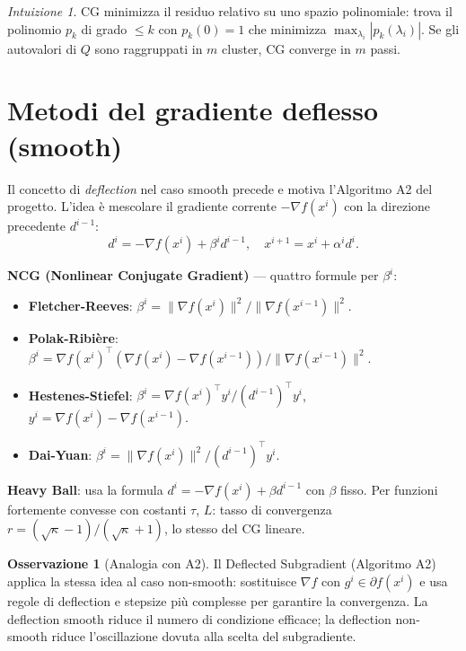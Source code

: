 \documentclass[11pt, a4paper, twoside]{book}
\theoremstyle{definition}
\newtheorem{remark}{Osservazione}[chapter]
\theoremstyle{plain}
\theoremstyle{remark}
\newtheorem{intuition}{Intuizione}[chapter]
\begin{document}
\begin{intuition}
CG minimizza il residuo relativo su uno spazio polinomiale: trova il polinomio $p_k$ di grado $\leq k$ con $p_k(0) = 1$ che minimizza $\max_{\lambda_i} |p_k(\lambda_i)|$. Se gli autovalori di $Q$ sono raggruppati in $m$ cluster, CG converge in $m$ passi.
\end{intuition}

\section{Metodi del gradiente deflesso (smooth)}
\label{sec:deflected-smooth}

Il concetto di \emph{deflection} nel caso smooth precede e motiva l'Algoritmo A2 del progetto.
L'idea è mescolare il gradiente corrente $-\nabla f(x^i)$ con la direzione precedente $d^{i-1}$:
\[
  d^i = -\nabla f(x^i) + \beta^i d^{i-1}, \quad x^{i+1} = x^i + \alpha^i d^i.
\]

\textbf{NCG (Nonlinear Conjugate Gradient)} — quattro formule per $\beta^i$:
\begin{itemize}
  \item \textbf{Fletcher-Reeves}: $\beta^i = \|\nabla f(x^i)\|^2 / \|\nabla f(x^{i-1})\|^2$.
  \item \textbf{Polak-Ribière}: $\beta^i = \nabla f(x^i)^\top(\nabla f(x^i) - \nabla f(x^{i-1})) / \|\nabla f(x^{i-1})\|^2$.
  \item \textbf{Hestenes-Stiefel}: $\beta^i = \nabla f(x^i)^\top y^i / (d^{i-1})^\top y^i$, $y^i = \nabla f(x^i) - \nabla f(x^{i-1})$.
  \item \textbf{Dai-Yuan}: $\beta^i = \|\nabla f(x^i)\|^2 / (d^{i-1})^\top y^i$.
\end{itemize}

\textbf{Heavy Ball}: usa la formula $d^i = -\nabla f(x^i) + \beta d^{i-1}$ con $\beta$ fisso.
Per funzioni fortemente convesse con costanti $\tau$, $L$: tasso di convergenza
$r = (\sqrt{\kappa}-1)/(\sqrt{\kappa}+1)$, lo stesso del CG lineare.

\begin{remark}[Analogia con A2]
Il Deflected Subgradient (Algoritmo A2) applica la stessa idea al caso non-smooth:
sostituisce $\nabla f$ con $g^i \in \partial f(x^i)$ e usa regole di deflection e stepsize più
complesse per garantire la convergenza. La deflection smooth riduce il numero di condizione
efficace; la deflection non-smooth riduce l'oscillazione dovuta alla scelta del subgradiente.
\end{remark}
\end{document}
